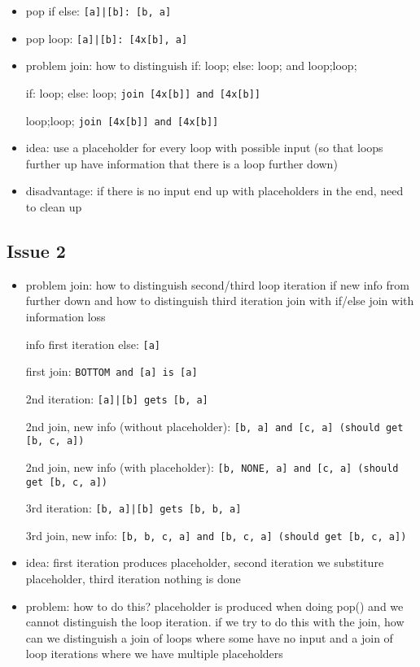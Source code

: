 \documentclass[11pt]{article}
\begin{document}
\begin{itemize}
\item pop if else: \verb/[a]|[b]: [b, a]/
\item pop loop: \verb/[a]|[b]: [4x[b], a]/
\item problem join: how to distinguish if: loop; else: loop; and loop;loop;

if: loop; else: loop; \verb/join [4x[b]] and [4x[b]]/

loop;loop; \verb/join [4x[b]] and [4x[b]]/

\item idea: use a placeholder for every loop with possible input (so that loops further up have information that there is a loop further down)
\item disadvantage: if there is no input end up with placeholders in the end, need to clean up
\end{itemize}

\subsection{Issue 2}

\begin{itemize}
\item problem join: how to distinguish second/third loop iteration if new info from further down and how to distinguish third iteration join with if/else join with information loss

info first iteration else: \verb/[a]/

first join: \verb/BOTTOM and [a] is [a]/

2nd iteration: \verb/[a]|[b] gets [b, a]/

2nd join, new info (without placeholder): \verb/[b, a] and [c, a] (should get [b, c, a])/

2nd join, new info (with placeholder): \verb/[b, NONE, a] and [c, a] (should get [b, c, a])/

3rd iteration: \verb/[b, a]|[b] gets [b, b, a]/

3rd join, new info: \verb/[b, b, c, a] and [b, c, a] (should get [b, c, a])/

\item idea: first iteration produces placeholder, second iteration we substiture placeholder, third iteration nothing is done
\item problem: how to do this? placeholder is produced when doing pop() and we cannot distinguish the loop iteration. if we try to do this with the join, how can we distinguish a join of loops where some have no input and a join of loop iterations where we have multiple placeholders
\end{itemize}
\end{document}
